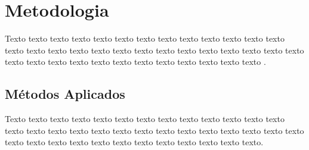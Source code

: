 \chapter{Metodologia}

Texto texto texto texto texto texto texto texto texto texto texto texto texto texto texto texto texto texto texto texto texto texto texto texto texto texto texto texto texto texto texto texto texto texto texto texto texto texto texto \citep{ref:Fensel,ref:booch}.




\section{Métodos Aplicados}

Texto texto texto texto texto texto texto texto texto texto texto texto texto texto texto texto texto texto texto texto texto texto texto texto texto texto texto texto texto texto texto texto texto texto texto texto texto texto texto.
